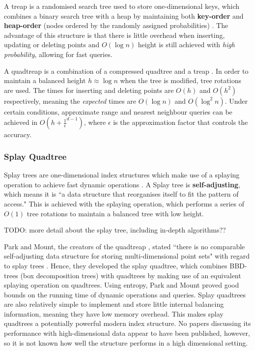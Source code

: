 A treap is a randomised search tree used to store one-dimensional keys, which combines a binary search tree with a heap by maintaining both \textbf{key-order} and \textbf{heap-order} (nodes ordered by the randomly assigned probabilities) \cite{quadtreap}. The advantage of this structure is that there is little overhead when inserting, updating or deleting points and $O(\log n)$ height is still achieved with \textit{high probability}, allowing for fast queries.

A quadtreap is a combination of a compressed quadtree and a treap \cite{quadtreap}. In order to maintain a balanced height $h \approx \log n$ when the tree is modified, tree rotations are used. The times for inserting and deleting points are $O(h)$ and $O(h^2)$ respectively, meaning the \textit{expected} times are $O(\log n)$ and $O(\log^2 n)$. Under certain conditions, approximate range and nearest neighbour queries can be achieved in $O(h + \frac{1}{\epsilon}^{d - 1})$, where $\epsilon$ is the approximation factor that controls the accuracy.

\subsubsection{Splay Quadtree}
\label{sec:splay-quadtree}

Splay trees are one-dimensional index structures which make use of a splaying operation to achieve fast dynamic operations \cite{introduction-to-algorithms}. A Splay tree is \textbf{self-adjusting}, which means it is ``a data structure that reorganises itself to fit the pattern of access." \cite{splay-quadtree} This is achieved with the splaying operation, which performs a series of $O(1)$ tree rotations to maintain a balanced tree with low height.

TODO: more detail about the splay tree, including in-depth algorithms??

Park and Mount, the creators of the quadtreap \cite{quadtreap}, stated ``there is no comparable self-adjusting data structure for storing multi-dimensional point sets" with regard to splay trees \cite{splay-quadtree}. Hence, they developed the splay quadtree, which combines BBD-trees (box decomposition trees) with quadtrees by making use of an equivalent splaying operation on quadtrees. Using entropy, Park and Mount proved good bounds on the running time of dynamic operations and queries. Splay quadtrees are also relatively simple to implement and store little internal balancing information, meaning they have low memory overhead. This makes splay quadtrees a potentially powerful modern index structure. No papers discussing its performance with high-dimensional data appear to have been published, however, so it is not known how well the structure performs in a high dimensional setting.
